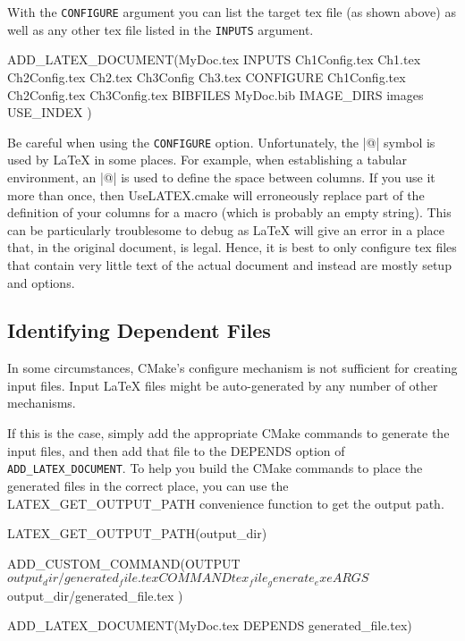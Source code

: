 \documentclass{article}
\newcommand*{\textfile}[1]{\textsf{#1}}
\newcommand*{\textcmake}[1]{\texttt{#1}}
\newcommand*{\UseLATEX}{\textfile{UseLATEX.cmake}\xspace}
\newcommand*{\latex}{\LaTeX\xspace}
\newcommand*{\ald}{\textcmake{ADD\_LATEX\_DOCUMENT}\xspace}
\begin{document}
  With the \textcmake{CONFIGURE} argument you can list the target tex file
  (as shown above) as well as any other tex file listed in the
  \textcmake{INPUTS} argument.

  \begin{CodeListing}
ADD_LATEX_DOCUMENT(MyDoc.tex
  INPUTS Ch1Config.tex Ch1.tex Ch2Config.tex
         Ch2.tex Ch3Config Ch3.tex
  CONFIGURE Ch1Config.tex Ch2Config.tex Ch3Config.tex
  BIBFILES MyDoc.bib
  IMAGE_DIRS images
  USE_INDEX
  )
  \end{CodeListing}

  Be careful when using the \textcmake{CONFIGURE} option. Unfortunately,
  the \textlatex|@| symbol is used by \latex in some places. For example,
  when establishing a tabular environment, an \textlatex|@| is used to
  define the space between columns. If you use it more than once, then
  \UseLATEX will erroneously replace part of the definition of your columns
  for a macro (which is probably an empty string). This can be particularly
  troublesome to debug as \latex will give an error in a place that, in the
  original document, is legal. Hence, it is best to only configure tex
  files that contain very little text of the actual document and instead
  are mostly setup and options.

  \subsection{Identifying Dependent Files}
  \label{sec:IdentifyingDependentFiles}

  In some circumstances, CMake's configure mechanism is not sufficient for
  creating input files.  Input \latex files might be auto-generated by any
  number of other mechanisms.

  If this is the case, simply add the appropriate CMake commands to
  generate the input files, and then add that file to the DEPENDS option of
  \ald.  To help you build the CMake commands to place the generated files
  in the correct place, you can use the LATEX\_GET\_OUTPUT\_PATH convenience
  function to get the output path.

  \begin{CodeListing}
LATEX_GET_OUTPUT_PATH(output_dir)

ADD_CUSTOM_COMMAND(OUTPUT ${output_dir}/generated_file.tex
  COMMAND tex_file_generate_exe
  ARGS ${output_dir}/generated_file.tex
  )

ADD_LATEX_DOCUMENT(MyDoc.tex DEPENDS generated_file.tex)
  \end{CodeListing}
\end{document}
